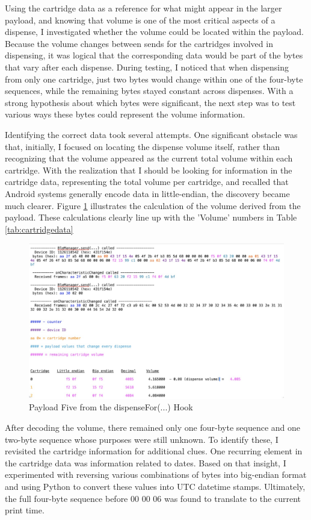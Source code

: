 Using the cartridge data as a reference for what might appear in the larger payload, and knowing that volume is one of the most critical aspects of a dispense, I investigated whether the volume could be located within the payload. Because the volume changes between sends for the cartridges involved in dispensing, it was logical that the corresponding data would be part of the bytes that vary after each dispense. During testing, I noticed that when dispensing from only one cartridge, just two bytes would change within one of the four-byte sequences, while the remaining bytes stayed constant across dispenses. With a strong hypothesis about which bytes were significant, the next step was to test various ways these bytes could represent the volume information.

Identifying the correct data took several attempts. One significant obstacle was that, initially, I focused on locating the dispense volume itself, rather than recognizing that the volume appeared as the current total volume within each cartridge. With the realization that I should be looking for information in the cartridge data, representing the total volume per cartridge, and recalled that Android systems generally encode data in little-endian, the discovery became much clearer. Figure \ref{fig:payload5} illustrates the calculation of the volume derived from the payload. These calculations clearly line up with the 'Volume' numbers in Table \ref{tab:cartridgedata}
\begin{figure}[H]
	\centering
	\includegraphics[width=0.7\linewidth]{payload5}
	\caption{Payload Five from the dispenseFor(...) Hook}
	\label{fig:payload5}
\end{figure}

After decoding the volume, there remained only one four-byte sequence and one two-byte sequence whose purposes were still unknown. To identify these, I revisited the cartridge information for additional clues. One recurring element in the cartridge data was information related to dates. Based on that insight, I experimented with reversing various combinations of bytes into big-endian format and using Python to convert these values into UTC datetime stamps. Ultimately, the full four-byte sequence before 00 00 06 was found to translate to the current print time.

